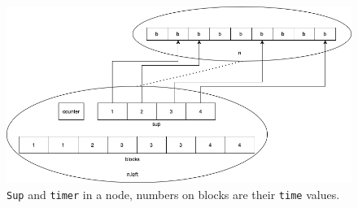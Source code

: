 \documentclass[10pt]{article}
\theoremstyle{definition}
\begin{document}
\begin{figure}[hbt]
  \center\includegraphics[width=6in]{pics/super}
  \caption{\texttt{Sup} and \texttt{timer} in a node, numbers on blocks are their \texttt{time} values.}
\end{figure}
\end{document}
